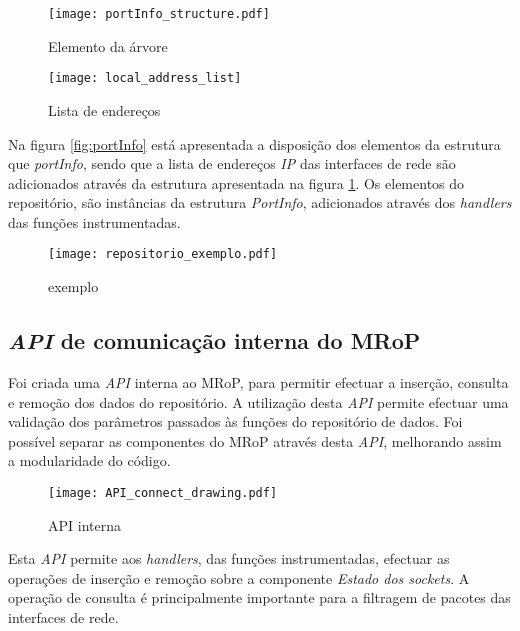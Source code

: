 \begin{figure}[ht]
\begin{minipage}[b]{0.5\linewidth}
\centering
\texttt{[image: portInfo\_structure.pdf]}
\caption{Elemento da árvore}
\label{fig:portInfo}
\end{minipage}
\hspace{0.5cm}
\begin{minipage}[b]{0.5\linewidth}
\centering
\texttt{[image: local\_address\_list]}
\caption{Lista de endereços}
\label{fig:local_address_list}
\end{minipage}
\end{figure}

Na figura \ref{fig:portInfo} está apresentada a disposição dos elementos da estrutura que \textit{portInfo}, sendo que a lista de endereços \textit{IP} das interfaces de rede são adicionados através da estrutura apresentada na figura \ref{fig:local_address_list}.
Os elementos do repositório, são instâncias da estrutura \textit{PortInfo}, adicionados através dos \textit{handlers} das funções instrumentadas.


\begin{figure}[ht]
\centering
\texttt{[image: repositorio\_exemplo.pdf]}
\caption{exemplo}
\label{fig:repo_example}
\end{figure}

\subsection{\textit{API} de comunicação interna do MRoP}
\label{sub:repo_api}

Foi criada uma \textit{API} interna ao MRoP, para permitir efectuar a inserção, consulta e remoção dos dados do repositório.
A utilização desta \textit{API} permite efectuar uma validação dos parâmetros passados às funções do repositório de dados.
Foi possível separar as componentes do MRoP através desta \textit{API}, melhorando assim a modularidade do código.

\begin{figure}[ht]
\centering
\texttt{[image: API\_connect\_drawing.pdf]}
\caption{API interna}
\label{fig:api_connect}
\end{figure}

Esta \textit{API} permite aos \textit{handlers}, das funções instrumentadas, efectuar as operações de inserção e remoção sobre a componente \textit{Estado dos sockets}.
A operação de consulta é principalmente importante para a filtragem de pacotes das interfaces de rede.

